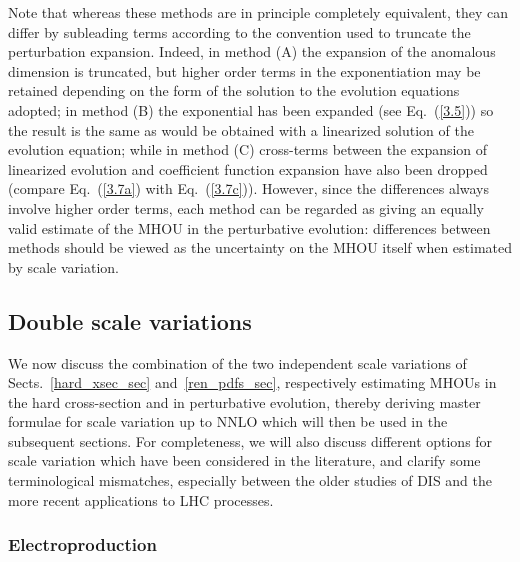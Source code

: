 Note that whereas these methods are in principle completely
equivalent, they can differ by subleading terms according to the
convention used to truncate the
perturbation expansion.
%
Indeed, in method (A)
the expansion of the anomalous dimension is truncated, but higher
order terms in the exponentiation may be retained depending on the
form of the solution to the evolution equations adopted; in method (B)
the exponential has been expanded (see Eq.~(\ref{3.5})) so the result
is the same as would be obtained with a linearized solution of the
evolution equation; while in method (C) cross-terms between the
expansion of linearized evolution and coefficient function expansion
have also been dropped (compare Eq.~(\ref{3.7a}) with
Eq.~(\ref{3.7c})).
%
However, since the differences always involve higher
order terms, each method can be regarded as giving an equally valid
estimate of the MHOU in the perturbative evolution: differences
between methods should be viewed as the uncertainty on the MHOU itself
when estimated by scale variation.

\subsection{Double scale variations} \label{double_var_sec}

We now discuss the combination of the  two independent scale
variations of Sects.~\ref{hard_xsec_sec} and~\ref{ren_pdfs_sec},
respectively estimating MHOUs in the hard cross-section and in
perturbative evolution, thereby deriving master formulae for scale
variation up to NNLO which will then be used in the subsequent sections.
%
For completeness, we will also discuss
different options for scale variation which have been considered in
the literature, and clarify some terminological mismatches, especially
between the older studies of DIS and the more recent applications to
LHC processes.

\subsubsection{Electroproduction} \label{double_var_sec_DIS}

